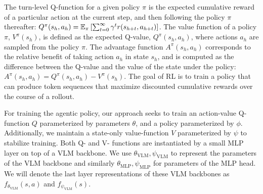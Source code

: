 The turn-level Q-function for a given policy $\pi$ is the expected cumulative reward of a particular action at the current step, and then following the policy $\pi$ thereafter: $Q^\pi(s_h,a_h) = \mathbb{E}_{\pi} \left[\sum_{t=0}^\infty \gamma^t r(s_{h+t}, a_{h+t})\right]$. The value function of a policy $\pi$, $V^\pi(s_h)$, is defined as the expected Q-value, $Q^\pi(s_h, a_h)$, where actions $a_h$ are sampled from the policy $\pi$. The advantage function $A^\pi(s_h,a_h)$ corresponds to the relative benefit of taking action $a_h$ in state $s_h$, and is computed as the difference between the Q-value and the value of the state under the policy: $A^\pi(s_h,a_h) = Q^\pi(s_h, a_h) - V^\pi(s_h)$. The goal of RL is to train a policy that can produce token sequences that maximize discounted cumulative rewards over the course of a rollout. 

For training the agentic policy, our approach seeks to train an action-value Q-function $Q$ parameterized by parameters $\theta$, and a policy parameterized by $\phi$. Additionally, we maintain a state-only value-function $V$ parameterized by $\psi$ to stabilize training. Both Q-  and V- functions are instantiated by a small MLP layer on top of a VLM backbone. We use $\theta_\mathrm{VLM}, \psi_\mathrm{VLM}$ to represent the parameters of the VLM backbone and similarly $\theta_\mathrm{MLP}, \psi_\mathrm{MLP}$ for parameters of the MLP head. We will denote the last layer representations of these VLM backbones as $f_{\theta_\mathrm{VLM}}(s,a)$ and $f_{\psi_\mathrm{VLM}}(s)$.

\vspace{-0.2cm}
